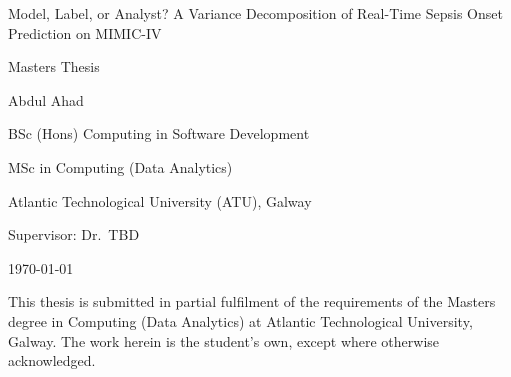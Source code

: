 \documentclass[english,12pt,a4paper,openany]{book}
\newcommand{\reportauthor}{Abdul Ahad}
\newcommand{\projecttitle}{Model, Label, or Analyst? A Variance Decomposition of Real-Time Sepsis Onset Prediction on MIMIC-IV}
\newcommand{\reporttype}{Masters Thesis}
\begin{document}
\begin{titlepage}


\color{white}
\raggedright

\vspace*{3cm}

\color{ATUGreen}
\Huge \projecttitle

\vspace*{0.5cm}

\LARGE \reporttype

\vspace*{2cm}

\Large \reportauthor

\vspace*{0.5cm}

\Large BSc (Hons) Computing in Software Development

\vspace*{0.5cm}

\Large MSc in Computing (Data Analytics)

\vspace*{0.5cm}

\Large Atlantic Technological University (ATU), Galway

\vspace*{0.5cm}

\Large Supervisor: Dr.\ TBD

\vspace*{0.5cm}

\Large \monthyeardate\today

\vspace*{1cm}

\normalsize
\color{black}
This thesis is submitted in partial fulfilment of the requirements of the Masters
degree in Computing (Data Analytics) at Atlantic Technological University, Galway.
The work herein is the student's own, except where otherwise acknowledged.

\restoregeometry
\end{titlepage}

\frontmatter




\tableofcontents
\listoffigures
\listoftables

\mainmatter








\backmatter
\printbibliography[heading=bibintoc, title={References}]
\end{document}
